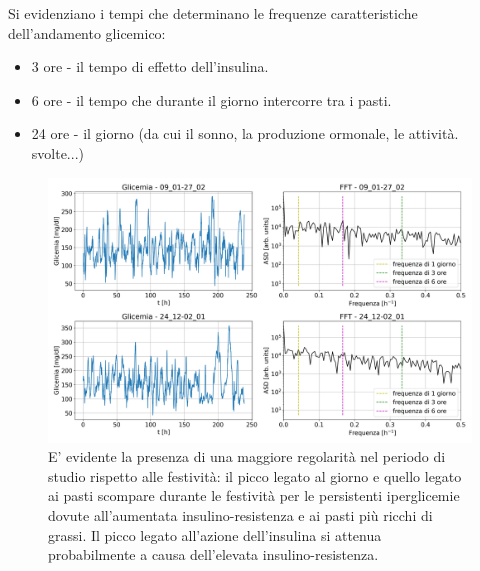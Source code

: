 \documentclass{article}
\begin{document}
        Si evidenziano i tempi che determinano le frequenze caratteristiche dell'andamento glicemico:
            \begin{itemize}
                \item 3 ore - il tempo di effetto dell'insulina.
                \item 6 ore - il tempo che durante il giorno intercorre tra i pasti.
                \item 24 ore - il giorno (da cui il sonno, la produzione ormonale, le attività.
                svolte...)
            \end{itemize}
            \begin{figure}[H]
                \centering
                \includegraphics[width=\textwidth]{rubbish/rubbish.png}
                \caption{E' evidente la presenza di una maggiore regolarità nel 
                periodo di studio rispetto alle festività: il picco legato
                al giorno e quello legato ai pasti scompare durante le festività 
                per le persistenti iperglicemie dovute all'aumentata insulino-resistenza e ai pasti più ricchi di grassi.
                Il picco legato all'azione dell'insulina si attenua probabilmente
                a causa dell'elevata insulino-resistenza.}
                \label{fig:rubbish}
            \end{figure} 
\end{document}
